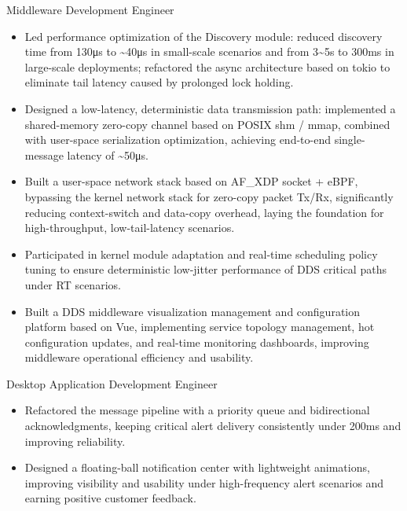 \documentclass{resume}
\begin{document}
\begin{onehalfspacing}
Middleware Development Engineer
\begin{itemize}
  \item Led performance optimization of the Discovery module: reduced discovery time from 130μs to \textasciitilde40μs in small-scale scenarios and from 3\textasciitilde5s to 300ms in large-scale deployments; refactored the async architecture based on tokio to eliminate tail latency caused by prolonged lock holding.
  \item Designed a low-latency, deterministic data transmission path: implemented a shared-memory zero-copy channel based on POSIX shm / mmap, combined with user-space serialization optimization, achieving end-to-end single-message latency of \textasciitilde50μs.
  \item Built a user-space network stack based on AF\_XDP socket + eBPF, bypassing the kernel network stack for zero-copy packet Tx/Rx, significantly reducing context-switch and data-copy overhead, laying the foundation for high-throughput, low-tail-latency scenarios.
  \item Participated in kernel module adaptation and real-time scheduling policy tuning to ensure deterministic low-jitter performance of DDS critical paths under RT scenarios.
  \item Built a DDS middleware visualization management and configuration platform based on Vue, implementing service topology management, hot configuration updates, and real-time monitoring dashboards, improving middleware operational efficiency and usability.
\end{itemize}
\end{onehalfspacing}


\begin{onehalfspacing}
Desktop Application Development Engineer
\begin{itemize}
  \item Refactored the message pipeline with a priority queue and bidirectional acknowledgments, keeping critical alert delivery consistently under 200ms and improving reliability.
  \item Designed a floating-ball notification center with lightweight animations, improving visibility and usability under high-frequency alert scenarios and earning positive customer feedback.
\end{itemize}
\end{onehalfspacing}
\end{document}
